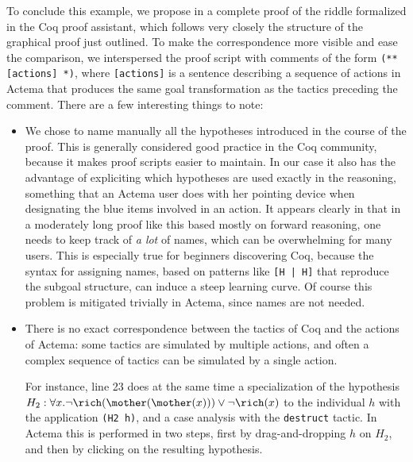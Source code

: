 To conclude this example, we propose in  a complete proof of
the riddle formalized in the Coq proof assistant, which follows very closely the
structure of the graphical proof just outlined. To make the correspondence more
visible and ease the comparison, we interspersed the proof script with comments
of the form \texttt{(** [actions] *)}, where \texttt{[actions]} is a
sentence describing a sequence of actions in Actema that produces the same goal
transformation as the tactics preceding the comment. There are a few interesting
things to note:
\begin{itemize}
  \item We chose to name manually all the hypotheses introduced in the course of
  the proof. This is generally considered good practice in the Coq community,
  because it makes proof scripts easier to maintain. In our case it also has the
  advantage of expliciting which hypotheses are used exactly in the reasoning,
  something that an Actema user does with her pointing device when designating
  the blue items involved in an action. It appears clearly in
   that in a moderately long proof like this based mostly on
  forward reasoning, one needs to keep track of \emph{a lot} of names, which can
  be overwhelming for many users. This is especially true for beginners
  discovering Coq, because the syntax for assigning names, based on patterns
  like \texttt{[H | H]} that reproduce the subgoal structure, can induce a steep
  learning curve. Of course this problem is mitigated trivially in Actema, since
  names are not needed.

  \item There is no exact correspondence between the tactics of Coq and the
  actions of Actema: some tactics are simulated by multiple actions, and often a
  complex sequence of tactics can be simulated by a single action.
  
  For instance, line 23 does at the same time a specialization of the hypothesis
  $H_2 : \forall x. \neg \rich(\mother(\mother(x))) \lor \neg \rich(x)$ to the
  individual $h$ with the application \texttt{(H2 h)}, and a case analysis with
  the \texttt{destruct} tactic. In Actema this is performed in two steps, first
  by drag-and-dropping $h$ on $H_2$, and then by clicking on the resulting
  hypothesis.


\end{itemize}
